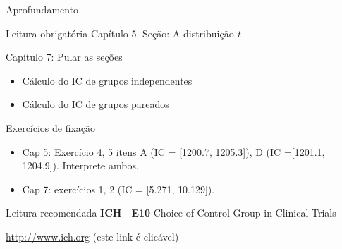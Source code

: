\documentclass{beamer}
\begin{document}
\begin{frame}{Aprofundamento}
  \begin{block}{Leitura obrigatória}
    Capítulo 5. Seção: A distribuição {\em t}

    Capítulo 7: Pular as seções
    \begin{itemize}
    \item Cálculo do IC de grupos independentes
    \item Cálculo do IC de grupos pareados
    \end{itemize}
  \end{block}
  \begin{block}{Exercícios de fixação}
    \begin{itemize}
    \item Cap 5: Exercício 4, 5 itens A (IC = [1200.7, 1205.3]), D (IC =[1201.1, 1204.9]). Interprete ambos.
    \item Cap 7: exercícios 1, 2 (IC = [5.271, 10.129]).
    \end{itemize}
  \end{block}
  \begin{block}{Leitura recomendada}
    {\bf ICH} - {\bf E10} Choice of Control Group in Clinical Trials

    \href{http://www.ich.org/products/guidelines/efficacy/efficacy-single/article/choice-of-control-group-and-related-issues-in-clinical-trials.html}{http://www.ich.org} {\tiny (este link é clicável)}
  \end{block}
\end{frame}
\end{document}
